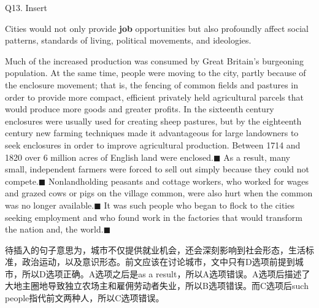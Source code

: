 \begin{blk}
    \begin{qst}
        Q13. Insert
    \end{qst}

    \begin{chc}
        Cities would not only provide \textbf{job} opportunities but also profoundly affect social patterns, standards of living, political movements, and ideologies.
    \end{chc}

    \begin{psgq}
        Much of the increased production was consumed by Great Britain’s burgeoning population. At the same time, people were moving to the city, partly because of the enclosure movement; that is, the fencing of common fields and pastures in order to provide more compact, efficient privately held agricultural parcels that would produce more goods and greater profits. In the sixteenth century enclosures were usually used for creating sheep pastures, but by the eighteenth century new farming techniques made it advantageous for large landowners to seek enclosures in order to improve agricultural production. Between 1714 and 1820 over 6 million acres of English land were enclosed.$\blacksquare$ As a result, many small, independent farmers were forced to sell out simply because they could not compete.$\blacksquare$ Nonlandholding peasants and cottage workers, who worked for wages and grazed cows or pigs on the village common, were also hurt when the common was no longer available.$\blacksquare$ It was such people who began to flock to the cities seeking employment and who found work in the factories that would transform the nation and, the world.$\blacksquare$
    \end{psgq}

    \begin{nlz}
        待插入的句子意思为，城市不仅提供就业机会，还会深刻影响到社会形态，生活标准，政治运动，以及意识形态。前文应该在讨论城市，文中只有D选项前提到城市，所以D选项正确。A选项之后是as a result，所以A选项错误。A选项后描述了大地主圈地导致独立农场主和雇佣劳动者失业，所以B选项错误。而C选项后such people指代前文两种人，所以C选项错误。
    \end{nlz}
\end{blk}